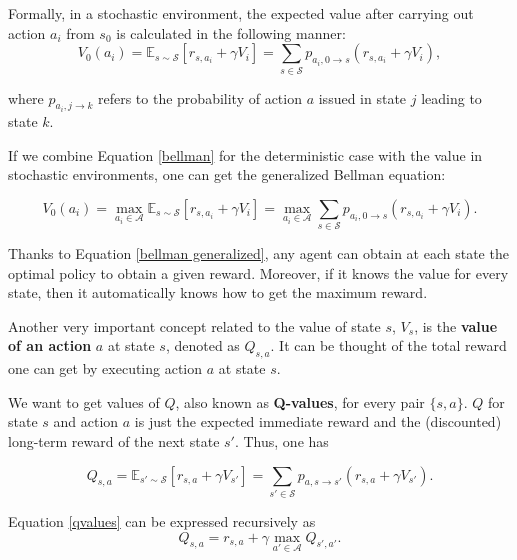 \documentclass[11pt]{article}
\theoremstyle{definition}
\begin{document}
Formally, in a stochastic environment, the expected value after carrying out action $a_i$ from $s_0$ is calculated in the following manner:
\begin{equation*}
    V_0(a_i) = \mathbb{E}_{s\sim \mathcal{S}}[r_{s,a_i} + \gamma V_i] = \sum_{s \in \mathcal{S}} p_{a_i, 0 \rightarrow s} (r_{s, a_i} + \gamma V_i),
\end{equation*}

where $p_{a_i, j \rightarrow k}$ refers to the probability of action $a$ issued in state $j$ leading to state $k$.

If we combine Equation \ref{bellman} for the deterministic case with the value in stochastic environments, one can get the generalized Bellman equation: 

\begin{equation} \label{bellman generalized}
    V_0(a_i) = \max_{a_i \in \mathcal{A}} \mathbb{E}_{s\sim \mathcal{S}}[r_{s,a_i} + \gamma V_i] = \max_{a_i \in \mathcal{A}} \sum_{s \in \mathcal{S}} p_{a_i, 0 \rightarrow s} (r_{s, a_i} + \gamma V_i).
\end{equation}

Thanks to Equation \ref{bellman generalized}, any agent can obtain at each state the optimal policy to obtain a given reward. Moreover, if it knows the value for every state, then it automatically knows how to get the maximum reward.

Another very important concept related to the value of state $s$, $V_s$, is the \textbf{value of an action} $a$ at state $s$, denoted as $Q_{s, a}$. It can be thought of the total reward one can get by executing action $a$ at state $s$. 

We want to get values of $Q$, also known as \textbf{Q-values}, for every pair $\{s, a\}$. $Q$ for state $s$ and action $a$ is just the expected immediate reward and the (discounted) long-term reward of the next state $s'$. Thus, one has

\begin{equation} \label{qvalues}
    Q_{s, a} = \mathbb{E}_{s' \sim \mathcal{S}} [r_{s, a} + \gamma V_ {s'}] = \sum_{s' \in \mathcal{S}} p_{a, s \rightarrow s'} (r_{s, a} + \gamma V_{s'}).
\end{equation}

Equation \ref{qvalues} can be expressed recursively as 
\begin{equation*}
    Q_{s, a} = r_{s, a} + \gamma \max_{a' \in \mathcal{A}} Q_{s', a'}.
\end{equation*}
\end{document}
